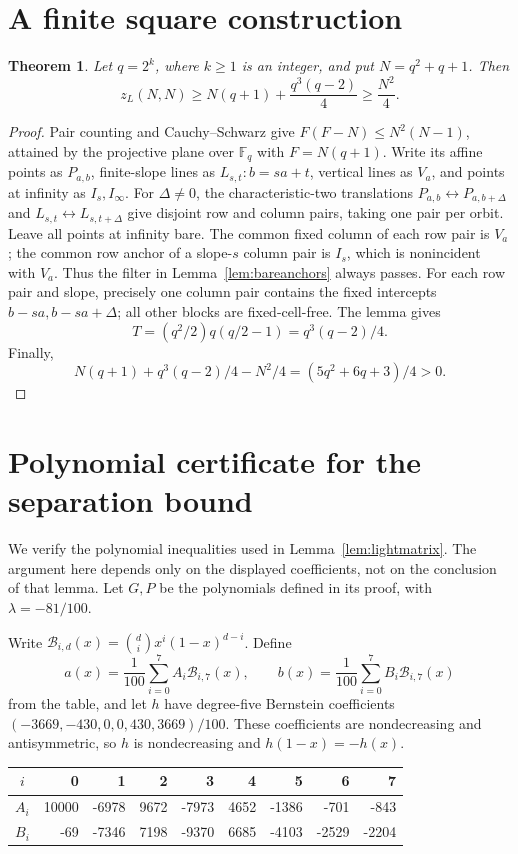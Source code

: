 \documentclass[11pt]{article}
\newtheorem{theorem}{Theorem}
\newcommand{\zl}{z_L}
\begin{document}
\section{A finite square construction}\label{sec:squarelower}

\begin{theorem}\label{thm:squarelower}
Let $q=2^k$, where $k\ge1$ is an integer, and put $N=q^2+q+1$. Then
\[
 \zl(N,N)\ge N(q+1)+\frac{q^3(q-2)}4\ge\frac{N^2}{4}.
\]
\end{theorem}
\begin{proof}
Pair counting and Cauchy--Schwarz give $F(F-N)\le N^2(N-1)$,
attained by the projective plane over $\mathbb F_q$ with $F=N(q+1)$.
Write its affine points as $P_{a,b}$, finite-slope lines as
$L_{s,t}:b=sa+t$, vertical lines as $V_a$, and points at infinity as
$I_s,I_\infty$. For $\Delta\ne0$, the characteristic-two translations
$P_{a,b}\leftrightarrow P_{a,b+\Delta}$ and
$L_{s,t}\leftrightarrow L_{s,t+\Delta}$ give disjoint row and column
pairs, taking one pair per orbit. Leave all points at infinity bare.
The common fixed column of each row pair is $V_a$; the common row
anchor of a slope-$s$ column pair is $I_s$, which is nonincident with
$V_a$. Thus the filter in Lemma~\ref{lem:bareanchors} always passes.
For each row pair and slope, precisely one column pair contains the
fixed intercepts $b-sa,b-sa+\Delta$; all other blocks are fixed-cell-free.
The lemma gives
\[
 T=(q^2/2)q(q/2-1)=q^3(q-2)/4.
\]
Finally,
\[
 N(q+1)+q^3(q-2)/4-N^2/4=(5q^2+6q+3)/4>0.
\]
\end{proof}

\section{Polynomial certificate for the separation bound}\label{sec:certificate}
We verify the polynomial inequalities used in Lemma~\ref{lem:lightmatrix}.
The argument here depends only on the displayed coefficients, not on
the conclusion of that lemma. Let $G,P$ be the polynomials defined in
its proof, with $\lambda=-81/100$.

Write $\mathcal B_{i,d}(x)=\binom di x^i(1-x)^{d-i}$. Define
\[
 a(x)=\frac1{100}\sum_{i=0}^7 A_i\mathcal B_{i,7}(x),\qquad
 b(x)=\frac1{100}\sum_{i=0}^7 B_i\mathcal B_{i,7}(x)
\]
from the table, and let $h$ have degree-five Bernstein coefficients
$(-3669,-430,0,0,430,3669)/100$.
These coefficients are nondecreasing and antisymmetric, so $h$ is
nondecreasing and $h(1-x)=-h(x)$. 
\begin{center}
\small
\begin{tabular}{c|rrrrrrrr}
 $i$&0&1&2&3&4&5&6&7\\ \hline
 $A_i$&10000&-6978&9672&-7973&4652&-1386&-701&-843\\
 $B_i$&-69&-7346&7198&-9370&6685&-4103&-2529&-2204
\end{tabular}
\end{center}
\end{document}
